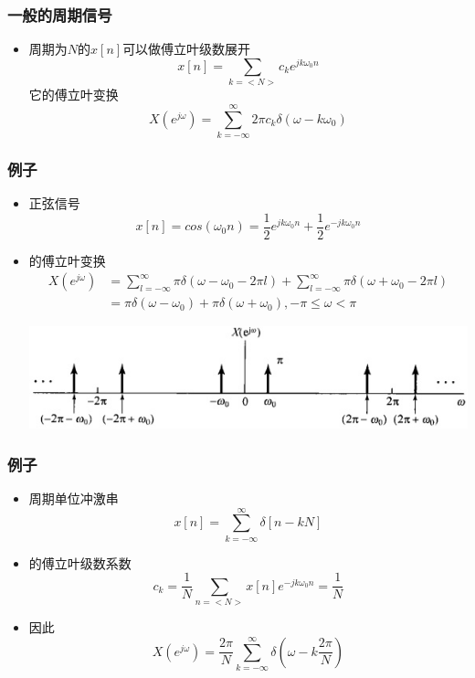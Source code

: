 \documentclass[CJKutf8,dvipsnames,table]{beamer}
\begin{document}
\begin{CJK*}{UTF8}{song}
\begin{frame}
\begin{itemize}
    \end{itemize}
  \end{frame}     
  
  \begin{frame}
    \frametitle{一般的周期信号}
    \begin{itemize}
    \item 周期为$N$的$x[n]$可以做傅立叶级数展开
    \[
    	x[n] = \sum_{k=<N>} c_k e^{jk\omega_0 n}
    \]
    它的傅立叶变换
    \[
    	X(e^{j\omega})=\sum_{k=-\infty}^{\infty}2\pi c_k \delta(\omega - k\omega_0)
    \]
    \end{itemize}

  \end{frame}   
  
  \begin{frame}
    \frametitle{例子}
    \begin{itemize}
    \item 正弦信号
    \[
    	x[n]=cos(\omega_0 n)=\frac{1}{2}e^{jk\omega_0 n}+\frac{1}{2}e^{-jk\omega_0 n}
	\]
	\item 的傅立叶变换
        \begin{align*}
 		X(e^{j\omega}) & = \sum_{l=-\infty}^{\infty}\pi \delta(\omega - \omega_0 - 2\pi l)+\sum_{l=-\infty}^{\infty}\pi \delta(\omega + \omega_0 - 2\pi l) \\
		& = \pi \delta(\omega - \omega_0)+\pi \delta(\omega + \omega_0), -\pi \leq \omega < \pi   
    	\end{align*} 	
	
    	\begin{center}
    	\includegraphics[scale=.5]{ss-c-f5-10}
    	\end{center}
    \end{itemize}

  \end{frame}    
  
  \begin{frame}
    \frametitle{例子}
    \begin{itemize}
    \item 周期单位冲激串
    \[
	    x[n]=\sum_{k=-\infty}^{\infty}\delta[n-kN]
    \]
    \item 的傅立叶级数系数
    \[
    	c_k=\frac{1}{N}\sum_{n=<N>}x[n]e^{-jk\omega_0 n}=\frac{1}{N}
    \]
	\item 因此
        \[
 			X(e^{j\omega}) = \frac{2\pi}{N}\sum_{k=-\infty}^{\infty}\delta(\omega - k\frac{2\pi}{N})   
    	\]	
	

\end{itemize}
\end{frame}
\end{CJK*}
\end{document}
